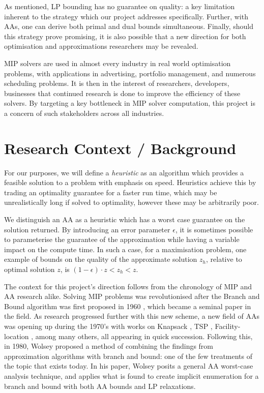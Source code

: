 \documentclass[12pt, a4paper]{article}
\begin{document}
As mentioned, LP bounding has no guarantee on quality: a key limitation inherent to the strategy which our project addresses specifically. Further, with AAs, one can derive both primal and dual bounds simultaneous. Finally, should this strategy prove promising, it is also possible that a new direction for both optimisation and approximations researchers may be revealed. 

MIP solvers are used in almost every industry in real world optimisation problems, with applications in advertising, portfolio management, and numerous scheduling problems. It is then in the interest of researchers, developers, businesses that continued research is done to improve the efficiency of these solvers. By targeting a key bottleneck in MIP solver computation, this project is a concern of such stakeholders across all industries. 

\section{Research Context / Background}

For our purposes, we will define a \textit{heuristic} as an algorithm which provides a feasible solution to a problem with emphasis on speed. Heuristics achieve this by trading an optimality guarantee for a faster run time, which may be unrealistically long if solved to optimality, however these may be arbitrarily poor.

We distinguish an AA as a heuristic which has a worst case guarantee on the solution returned. By introducing an error parameter $\epsilon$, it is sometimes possible to parameterise the guarantee of the approximation while having a variable impact on the compute time. In such a case, for a maximisation problem, one example of bounds on the quality of the approximate solution $z_h$, relative to optimal solution $z$, is $(1-\epsilon)\cdot z < z_h < z$.   

The context for this project's direction follows from the chronology of MIP and AA research alike. Solving MIP problems was revolutionised after the Branch and Bound algorithm was first proposed in 1960 \cite{LandDoig}, which became a seminal paper in the field. As research progressed further with this new scheme, a new field of AAs was opening up during the 1970's with works on Knapsack \cite{IbarraKim}, TSP \cite{CristofidesTSP}, Facility-location \cite{CornuejolsFisherNemhauser}, among many others, all appearing in quick succession. Following this, in 1980, Wolsey \cite{WOLSEY} proposed a method of combining the findings from approximation algorithms with branch and bound: one of the few treatments of the topic that exists today. In his paper, Wolsey posits a general AA worst-case analysis technique, and applies what is found to create implicit enumeration for a branch and bound with both AA bounds and LP relaxations. 
\end{document}
